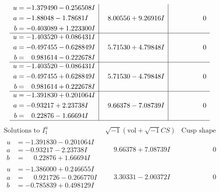 \documentclass[1p]{elsarticle_modified}
\theoremstyle{definition}
\newcommand{\I}{\sqrt{-1}}
\begin{document}
$$\begin{array}{c|c|c}
\begin{aligned}
u &= -1.379490 - 0.256508 I \\
a &= -1.88048 - 1.78681 I \\
b &= -0.403089 + 1.223300 I\end{aligned}
 & \phantom{-}8.00556 + 9.26916 I & \phantom{-0.000000 } 0 \\ \hline\begin{aligned}
u &= -1.403520 + 0.086431 I \\
a &= -0.497455 - 0.628849 I \\
b &= \phantom{-}0.981614 - 0.222678 I\end{aligned}
 & \phantom{-}5.71530 + 4.79848 I & \phantom{-0.000000 } 0 \\ \hline\begin{aligned}
u &= -1.403520 - 0.086431 I \\
a &= -0.497455 + 0.628849 I \\
b &= \phantom{-}0.981614 + 0.222678 I\end{aligned}
 & \phantom{-}5.71530 - 4.79848 I & \phantom{-0.000000 } 0 \\ \hline\begin{aligned}
u &= -1.391830 + 0.201064 I \\
a &= -0.93217 + 2.23738 I \\
b &= \phantom{-}0.22876 - 1.66694 I\end{aligned}
 & \phantom{-}9.66378 - 7.08739 I & \phantom{-0.000000 } 0\\
 \hline 
 \end{array}$$\newpage$$\begin{array}{c|c|c}  
\text{Solutions to }I^u_{1}& \I (\text{vol} + \sqrt{-1}CS) & \text{Cusp shape}\\
 \hline 
\begin{aligned}
u &= -1.391830 - 0.201064 I \\
a &= -0.93217 - 2.23738 I \\
b &= \phantom{-}0.22876 + 1.66694 I\end{aligned}
 & \phantom{-}9.66378 + 7.08739 I & \phantom{-0.000000 } 0 \\ \hline\begin{aligned}
u &= -1.386000 + 0.246655 I \\
a &= \phantom{-}0.921726 - 0.266770 I \\
b &= -0.785839 + 0.498129 I\end{aligned}
 & \phantom{-}3.30331 - 2.00372 I & \phantom{-0.000000 } 0 \\ \hline\begin{aligned}

\end{aligned}
\end{array}$$
\end{document}
